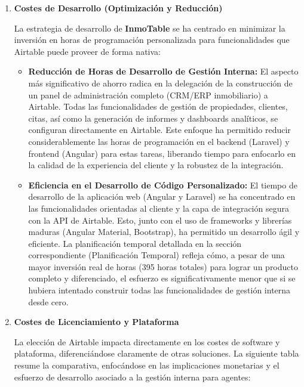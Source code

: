\begin{enumerate}
    \item \textbf{Costes de Desarrollo (Optimización y Reducción)}
    
    La estrategia de desarrollo de \textbf{InmoTable} se ha centrado en minimizar la inversión en horas de programación personalizada para funcionalidades que Airtable puede proveer de forma nativa:
    
    \begin{itemize}
        \item \textbf{Reducción de Horas de Desarrollo de Gestión Interna:} El aspecto más significativo de ahorro radica en la delegación de la construcción de un panel de administración completo (CRM/ERP inmobiliario) a Airtable. Todas las funcionalidades de gestión de propiedades, clientes, citas, así como la generación de informes y dashboards analíticos, se configuran directamente en Airtable. Este enfoque ha permitido reducir considerablemente las horas de programación en el backend (Laravel) y frontend (Angular) para estas tareas, liberando tiempo para enfocarlo en la calidad de la experiencia del cliente y la robustez de la integración.
        
        \item \textbf{Eficiencia en el Desarrollo de Código Personalizado:} El tiempo de desarrollo de la aplicación web (Angular y Laravel) se ha concentrado en las funcionalidades orientadas al cliente y la capa de integración segura con la API de Airtable. Esto, junto con el uso de frameworks y librerías maduras (Angular Material, Bootstrap), ha permitido un desarrollo ágil y eficiente. La planificación temporal detallada en la sección correspondiente (Planificación Temporal) refleja cómo, a pesar de una mayor inversión real de horas (395 horas totales) para lograr un producto completo y diferenciado, el esfuerzo es significativamente menor que si se hubiera intentado construir todas las funcionalidades de gestión interna desde cero.
    \end{itemize}

    \item \textbf{Costes de Licenciamiento y Plataforma}

    La elección de Airtable impacta directamente en los costes de software y plataforma, diferenciándose claramente de otras soluciones. La siguiente tabla resume la comparativa, enfocándose en las implicaciones monetarias y el esfuerzo de desarrollo asociado a la gestión interna para agentes:
    

\end{enumerate}
